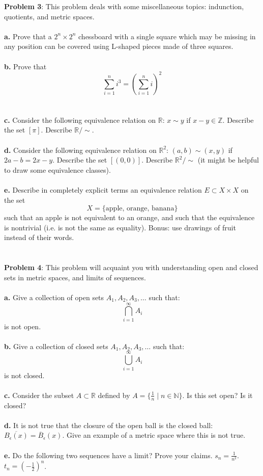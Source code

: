 \documentclass[UTF8,11pt]{article}
\begin{document}
\newpage

\noindent \textbf{Problem 3}: This problem deals with some miscellaneous topics: indunction, quotients, and metric spaces. \\
\\
\textbf{a.} Prove that a $2^n \times 2^n$ chessboard with a single square which may be missing in any position can be covered using L-shaped pieces made of three squares.   \\
\\
\textbf{b.} Prove that
$$\displaystyle \sum_{i=1}^n i^3 = (\displaystyle \sum_{i=1}^n i)^2$$ \\
\\
\textbf{c.} Consider the following equivalence relation on $\mathbb{R}$: $x \sim y$ if $x - y \in \mathbb{Z}$.  Describe the set $[\pi]$.  Describe $\mathbb{R}/\sim$. \\
\\
\textbf{d.} Consider the following equivalence relation on $\mathbb{R}^2$: $(a, b) \sim (x,y)$ if $2a - b = 2x - y$.  Describe the set $[(0,0)]$.  Describe $\mathbb{R}^2/\sim$ (it might be helpful to draw some equivalence classes).\\
\\
\textbf{e.} Describe in completely explicit terms an equivalence relation $E \subset X \times X$ on the set 
$$X = \{ \text{apple, orange, banana} \}$$
such that an apple is not equivalent to an orange, and such that the equivalence is nontrivial (i.e. is not the same as equality).  Bonus: use drawings of fruit instead of their words.
\\
\\
\\

\noindent \textbf{Problem 4}: This problem will acquaint you with understanding open and closed sets in metric spaces, and limits of sequences. \\
\\
\textbf{a.} Give a collection of open sets $A_1, A_2, A_3, \ldots$ such that:
$$\bigcap_{i=1}^\infty A_i$$
is not open.\\
\\
\textbf{b.} Give a collection of closed sets $A_1, A_2, A_3, \ldots$ such that:
$$\bigcup_{i=1}^\infty A_i$$
is not closed.\\
\\ 
\textbf{c.} Consider the subset $A \subset \mathbb{R}$ defined by $A = \{\frac{1}{n} \mid n \in \mathbb{N}\}$.  Is this set open?  Is it closed? \\
\\
\textbf{d.} It is not true that the closure of the open ball is the closed ball: $\overline{B_\epsilon(x)} = \overline{B}_\epsilon(x)$.  Give an example of a metric space where this is not true. \\
\\
\textbf{e.} Do the following two sequences have a limit?  Prove your claims.  $s_n = \frac{1}{n^2}$.  $t_n = (-\frac{1}{2})^n$.
\end{document}
